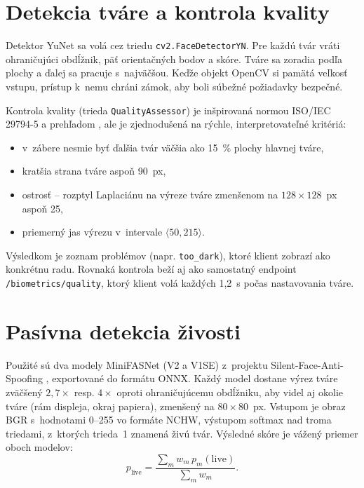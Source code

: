 \section{Detekcia tváre a kontrola kvality}

Detektor YuNet sa volá cez triedu \texttt{cv2.FaceDetectorYN}. Pre každú tvár vráti
ohraničujúci obdĺžnik, päť orientačných bodov a skóre. Tváre sa zoradia podľa plochy
a ďalej sa pracuje s~najväčšou. Keďže objekt OpenCV si pamätá veľkosť vstupu, prístup
k~nemu chráni zámok, aby boli súbežné požiadavky bezpečné.

Kontrola kvality (trieda \texttt{QualityAssessor}) je inšpirovaná normou ISO/IEC
29794-5 \cite{iso29794-5} a prehľadom \cite{schlett2022fiqa}, ale je zjednodušená na
rýchle, interpretovateľné kritériá:
\begin{itemize}
  \item v~zábere nesmie byť ďalšia tvár väčšia ako 15~\% plochy hlavnej tváre,
  \item kratšia strana tváre aspoň 90~px,
  \item ostrosť – rozptyl Laplaciánu na výreze tváre zmenšenom na $128\times128$~px aspoň 25,
  \item priemerný jas výrezu v~intervale $\langle 50, 215\rangle$.
\end{itemize}
Výsledkom je zoznam problémov (napr. \texttt{too\_dark}), ktoré klient zobrazí ako
konkrétnu radu. Rovnaká kontrola beží aj ako samostatný endpoint
\texttt{/biometrics/quality}, ktorý klient volá každých 1,2~s počas nastavovania tváre.

\section{Pasívna detekcia živosti}

Použité sú dva modely MiniFASNet (V2 a V1SE) z~projektu Silent-Face-Anti-Spoofing
\cite{minivision2020silentface}, exportované do formátu ONNX. Každý model dostane výrez
tváre zväčšený $2{,}7\times$ resp. $4\times$ oproti ohraničujúcemu obdĺžniku, aby videl
aj okolie tváre (rám displeja, okraj papiera), zmenšený na $80\times80$~px. Vstupom je
obraz BGR s~hodnotami 0--255 vo formáte NCHW, výstupom softmax nad troma triedami,
z~ktorých trieda~1 znamená živú tvár. Výsledné skóre je vážený priemer oboch modelov:
\begin{equation}
  p_{\mathrm{live}} = \frac{\sum_{m} w_m\, p_m(\text{live})}{\sum_m w_m}.
\end{equation}

